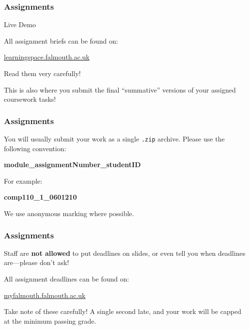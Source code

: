 \begin{frame}
	\frametitle{Assignments}
	
	Live Demo
	
	\vspace{3em}
	
	All assignment briefs can be found on:
	
	\vspace{0.5em}
	
	\indent \url{learningspace.falmouth.ac.uk}
	
	\vspace{0.5em}
	
	Read them very carefully!
	
	\vspace{0.5em}
	
	This is also where you submit the final ``summative'' versions of your assigned coursework tasks!
	
\end{frame}

\begin{frame}
	\frametitle{Assignments}
	
	You will usually submit your work as a single \texttt{.zip} archive. Please use the following convention:
	
	\begin{large}
		\begin{center}
			\textbf{module\_assignmentNumber\_studentID}
		\end{center}
	\end{large}
	
	For example:
	
	\begin{Large}
		\begin{center}
			\textbf{comp110\_1\_0601210}
		\end{center}
	\end{Large}
	
	\vspace{1em}
	
	We use anonymous marking where possible.

\end{frame}

\begin{frame}
	\frametitle{Assignments}
	
	Staff are \textbf{not allowed} to put deadlines on slides, or even tell you when deadlines are---please don't ask!
	
	\vspace{2em}
	
	All assignment deadlines can be found on:
	
	\vspace{1em}
	
	\indent \url{myfalmouth.falmouth.ac.uk}
	
	\vspace{1em}
	
	Take note of these carefully! A single second late, and your work will be capped at the minimum passing grade.
	
\end{frame}

